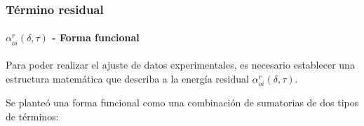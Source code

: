 \documentclass[aspectratio=1610,multi,rgb]{beamer}
\begin{document}
\begin{frame}
	\frametitle{Término residual}
	\framesubtitle{$\alpha_{oi}^r(\delta,\tau)$ - Forma funcional}
	Para poder realizar el ajuste de datos experimentales, es necesario
	establecer una estructura matemática que describa a la energía residual
	$\alpha_{oi}^r(\delta,\tau)$. 

	Se planteó una forma funcional como una combinación de sumatorias de
	dos tipos de términos:

	\begin{description}
	\end{description}
\end{frame}
\end{document}
